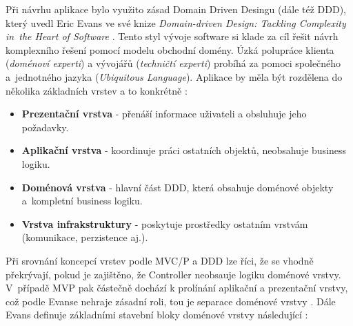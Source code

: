 Při návrhu aplikace bylo využito zásad Domain Driven Desingu (dále též DDD), který uvedl Eric Evans ve své knize \textit{Domain-driven Design: Tackling Complexity in~the Heart of Software} \cite{EvansDDD}. Tento styl vývoje software si klade za cíl řešit návrh komplexního řešení pomocí modelu obchodní domény. Úzká polupráce klienta (\textit{doménoví experti}) a vývojářů (\textit{techničtí experti}) probíhá za pomoci společného a~jednotného jazyka (\textit{Ubiquitous Language}). Aplikace by měla být rozdělena do několika základních vrstev a to konkrétně \cite{EvansDDD}:

\begin{itemize}
	\item \textbf{Prezentační vrstva} - přenáší informace uživateli a obsluhuje jeho požadavky.
	\item \textbf{Aplikační vrstva} - koordinuje práci ostatních objektů, neobsahuje business logiku.
	\item \textbf{Doménová vrstva} - hlavní část DDD, která obsahuje doménové objekty a~kompletní business logiku.
	\item \textbf{Vrstva infrakstruktury} - poskytuje prostředky ostatním vrstvám (komunikace, perzistence aj.).
\end{itemize}
\clearpage
Při srovnání koncepcí vrstev podle MVC/P a DDD lze říci, že se vhodně překrývají, pokud je zajištěno, že Controller neobsauje logiku doménové vrstvy. V~případě MVP pak částečně dochází k prolínání aplikační a prezentační vrstvy, což podle Evanse nehraje zásadní roli, tou je separace doménové vrstvy \cite{EvansDDD}. Dále Evans definuje základními stavební bloky doménové vrstvy následující \cite{EvansDDD}:
